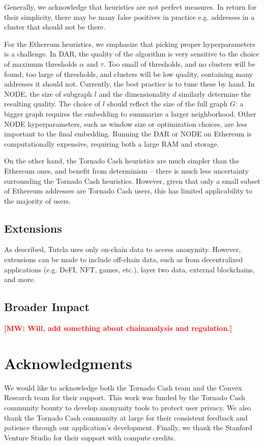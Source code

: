 \documentclass[11pt,a4paper]{article}
\newcommand{\mike}[1]{\textcolor{red}{\bf [MW: #1]}}
\begin{document}
Generally, we acknowledge that heuristics are not perfect measures. In return for their simplicity, there may be many false positives in practice e.g. addresses in a cluster that should not be there.

For the Ethereum heuristics, we emphasize that picking proper hyperparameters is a challenge. In DAR, the quality of the algorithm is very sensitive to the choice of maximum thresholds $\alpha$ and $\tau$. Too small of thresholds, and no clusters will be found; too large of thresholds, and clusters will be low quality, containing many addresses it should not. Currently, the best practice is to tune these by hand. In NODE, the size of subgraph $l$ and the dimensionality $d$ similarly determine the resulting quality. The choice of $l$ should reflect the size of the full graph $G$: a bigger graph requires the embedding to summarize a larger neighborhood. Other NODE hyperparameters, such as window size or optimization choices, are less important to the final embedding. Running the DAR or NODE on Ethereum is computationally expensive, requiring both a large RAM and storage.

On the other hand, the Tornado Cash heuristics are much simpler than the Ethereum ones, and benefit from  determinism -- there is much less uncertainty surrounding the Tornado Cash heuristics.
However, given that only a small subset of Ethereum addresses are Tornado Cash users, this has limited applicability to the majority of users.

\subsection{Extensions}

As described, Tutela uses only on-chain data to access anonymity. However, extensions can be made to include off-chain data, such as from decentralized applications (e.g. DeFI, NFT, games, etc.), layer two data, external blockchains, and more.

\subsection{Broader Impact}

\mike{Will, add something about chainanalysis and regulation.}

\section*{Acknowledgments}
We would like to acknowledge both the Tornado Cash team and the Convex Research team for their support. This work was funded by the Tornado Cash community bounty to develop anonymity tools to protect user privacy. We also thank the Tornado Cash community at large for their consistent feedback and patience through our application's development. Finally, we thank the Stanford Venture Studio for their support with compute credits.



\end{document}
